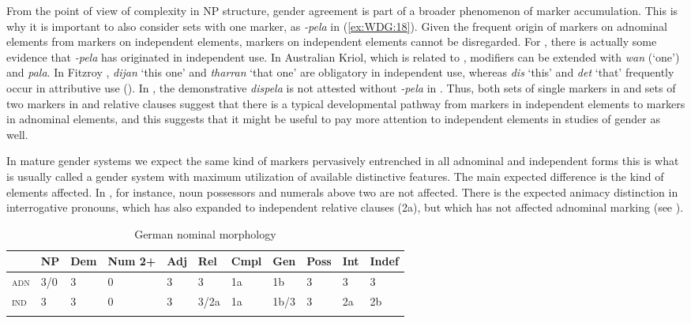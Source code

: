 \documentclass[output=collectionpaper]{langsci/langscibook}
\begin{document}
From the point of view of complexity in NP structure, gender agreement is part of a broader phenomenon of marker accumulation. This is why it is important to also consider sets with one marker, as  \textit{-pela} in (\ref{ex:WDG:18}). Given the frequent origin of markers on adnominal elements from markers on independent elements, markers on independent elements cannot be disregarded. For , there is actually some evidence that \textit{-pela} has originated in independent use. In Australian Kriol, which is related to , modifiers can be extended with \textit{wan} (`one') and \textit{pala}. In Fitzroy , \textit{dijan} `this one' and \textit{tharran} `that one' are obligatory in independent use, whereas \textit{dis} `this' and \textit{det} `that' frequently occur in attributive use (\citealt[79]{Hudson1985}). In , the demonstrative \textit{dispela} is not attested without \textit{-pela} in \cite{Verhaar1995}. Thus, both sets of single markers in  and sets of two markers in  and  relative clauses suggest that there is a typical developmental pathway from markers in independent elements to markers in adnominal elements, and this suggests that it might be useful to pay more attention to independent elements in studies of gender as well.

In mature gender systems we expect the same kind of markers pervasively entrenched in all adnominal and independent forms \textendash{} this is what is usually called a gender system with maximum utilization of available distinctive features. The main expected difference is the kind of elements affected. In , for instance, noun possessors and numerals above two are not affected. There is the expected animacy distinction in interrogative pronouns, which has also expanded to independent relative clauses (2a), but which has not affected adnominal marking (see ).


\begin{table}
\begin{tabular}{*{11}{l}}
  \lsptoprule
& NP & Dem & Num 2+ & Adj & Rel & Cmpl & Gen & Poss & Int & Indef \\
\midrule
\textsc{adn} & 3/0 & 3 & 0 & 3 & 3 & 1a & 1b & 3 & 3 & 3 \\
\textsc{ind} & 3 & 3 & 0 & 3 & 3/2a & 1a & 1b/3 & 3 & 2a & 2b \\
\lspbottomrule
\end{tabular}
\caption{German nominal morphology}
\label{tab:WDG:2}
\end{table}
\end{document}
